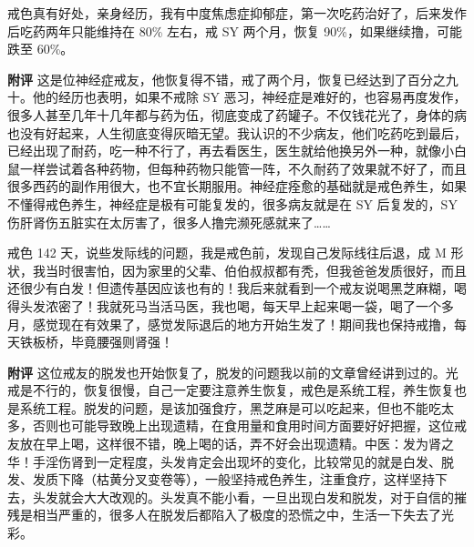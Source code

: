 \begin{case}
    戒色真有好处，亲身经历，我有中度焦虑症抑郁症，第一次吃药治好了，后来发作后吃药两年只能维持在 80\% 左右，戒 SY 两个月，恢复 90\%，如果继续撸，可能跌至 60\%。

    \textbf{附评} 这是位神经症戒友，他恢复得不错，戒了两个月，恢复已经达到了百分之九十。他的经历也表明，如果不戒除 SY 恶习，神经症是难好的，也容易再度发作，很多人甚至几年十几年都与药为伍，彻底变成了药罐子。不仅钱花光了，身体的病也没有好起来，人生彻底变得灰暗无望。我认识的不少病友，他们吃药吃到最后，已经出现了耐药，吃一种不行了，再去看医生，医生就给他换另外一种，就像小白鼠一样尝试着各种药物，但每种药物只能管一阵，不久耐药了效果就不好了，而且很多西药的副作用很大，也不宜长期服用。神经症痊愈的基础就是戒色养生，如果不懂得戒色养生，神经症是极有可能复发的，很多病友就是在 SY 后复发的，SY 伤肝肾伤五脏实在太厉害了，很多人撸完濒死感就来了……
\end{case}

\begin{case}
    戒色 142 天，说些发际线的问题，我是戒色前，发现自己发际线往后退，成 M 形状，我当时很害怕，因为家里的父辈、伯伯叔叔都有秃，但我爸爸发质很好，而且还很少有白发！但遗传基因应该也有的！我后来就看到一个戒友说喝黑芝麻糊，喝得头发浓密了！我就死马当活马医，我也喝，每天早上起来喝一袋，喝了一个多月，感觉现在有效果了，感觉发际退后的地方开始生发了！期间我也保持戒撸，每天铁板桥，毕竟腰强则肾强！

    \textbf{附评} 这位戒友的脱发也开始恢复了，脱发的问题我以前的文章曾经讲到过的。光戒是不行的，恢复很慢，自己一定要注意养生恢复，戒色是系统工程，养生恢复也是系统工程。脱发的问题，是该加强食疗，黑芝麻是可以吃起来，但也不能吃太多，否则也可能导致晚上出现遗精，在食用量和食用时间方面要好好把握，这位戒友放在早上喝，这样很不错，晚上喝的话，弄不好会出现遗精。中医：发为肾之华！手淫伤肾到一定程度，头发肯定会出现坏的变化，比较常见的就是白发、脱发、发质下降（枯黄分叉变卷等），一般坚持戒色养生，注重食疗，这样坚持下去，头发就会大大改观的。头发真不能小看，一旦出现白发和脱发，对于自信的摧残是相当严重的，很多人在脱发后都陷入了极度的恐慌之中，生活一下失去了光彩。
\end{case}

